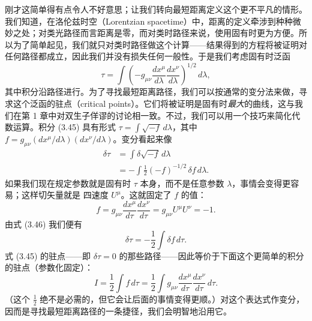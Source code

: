 刚才这简单得有点令人不好意思；让我们转向最短距离定义这个更不平凡的情形。我们知道，在洛伦兹时空（Lorentzian spacetime）中，距离的定义牵涉到种种微妙之处；对类光路径而言距离是零，而对类时路径来说，使用固有时更为方便。所以为了简单起见，我们就只对类时路径做这个计算——结果得到的方程将被证明对任何路径都成立，因此我们并没有损失任何一般性。于是我们考虑固有时泛函
\begin{equation*}
\tau = \int\left(-g_{\mu\nu}\frac{dx^\mu}{d\lambda}\frac{dx^\nu}{d\lambda}\right)^{1/2}\,d\lambda,
\tag{3.45}
\end{equation*}
其中积分沿路径进行。为了寻找最短距离路径，我们可以按通常的变分法来做，寻求这个泛函的驻点（critical points）。它们将被证明是固有时\emph{最大}的曲线，这与我们在第 1 章中对双生子佯谬的讨论相一致。不过，我们可以用一个技巧来简化代数运算。积分 (3.45) 具有形式 $\tau = \int\sqrt{-f}\,d\lambda$，其中 $f = g_{\mu\nu}(dx^\mu/d\lambda)(dx^\nu/d\lambda)$。变分看起来像
\begin{align*}
\delta\tau &= \int\delta\sqrt{-f}\,d\lambda\\
&= -\int\frac{1}{2}(-f)^{-1/2}\,\delta f\,d\lambda.
\tag{3.46}
\end{align*}
如果我们现在规定参数就是固有时 $\tau$ 本身，而不是任意参数 $\lambda$，事情会变得更容易；这样切矢量就是
四速度 $U^\mu$。这就固定了 $f$ 的值：
\begin{equation*}
f = g_{\mu\nu}\frac{dx^\mu}{d\tau}\frac{dx^\nu}{d\tau} = g_{\mu\nu}U^\mu U^\nu = -1.
\tag{3.47}
\end{equation*}
由式 (3.46) 我们便有
\begin{equation*}
\delta\tau = -\frac{1}{2}\int\delta f\,d\tau.
\tag{3.48}
\end{equation*}
式 (3.45) 的驻点——即 $\delta\tau = 0$ 的那些路径——因此等价于下面这个更简单的积分的驻点（参数化固定）：
\begin{equation*}
I = \frac{1}{2}\int f\,d\tau = \frac{1}{2}\int g_{\mu\nu}\frac{dx^\mu}{d\tau}\frac{dx^\nu}{d\tau}\,d\tau.
\tag{3.49}
\end{equation*}
（这个 $\frac{1}{2}$ 绝不是必需的，但它会让后面的事情变得更顺。）对这个表达式作变分，因而是寻找最短距离路径的一条捷径，我们会明智地沿用它。

